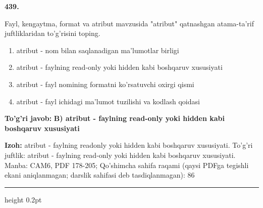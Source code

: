 \documentclass[10pt,a4paper]{article}
\begin{document}
{\bfseries\sffamily\color{ink} 439.}
\par
Fayl, kengaytma, format va atribut mavzusida "atribut" qatnashgan atama-ta'rif juftliklaridan to'g'risini toping.
\begin{enumerate}[label=\Alph*),leftmargin=9mm]
\item atribut - nom bilan saqlanadigan ma'lumotlar birligi
\item atribut - faylning read-only yoki hidden kabi boshqaruv xususiyati
\item atribut - fayl nomining formatni ko'rsatuvchi oxirgi qismi
\item atribut - fayl ichidagi ma'lumot tuzilishi va kodlash qoidasi
\end{enumerate}
\begin{tcolorbox}[enhanced,breakable,colback=teal!4,colframe=teal!60!black,boxrule=0.45pt,arc=1.2mm,left=2.7mm,right=2.7mm,top=1.8mm,bottom=1.8mm,before skip=2mm,after skip=2mm]
{\bfseries\sffamily\color{teal}To'g'ri javob:} \textbf{B) atribut - faylning read-only yoki hidden kabi boshqaruv xususiyati}
\par\smallskip
{\bfseries Izoh:} atribut - faylning readonly yoki hidden kabi boshqaruv xususiyati. To'g'ri juftlik: atribut - faylning read-only yoki hidden kabi boshqaruv xususiyati. Manba: CAM6, PDF 178-205; Qo'shimcha sahifa raqami (qaysi PDFga tegishli ekani aniqlanmagan; darslik sahifasi deb tasdiqlanmagan): 86
\end{tcolorbox}
\vspace{2mm}\hrule height 0.2pt\vspace{3mm}
\end{document}
